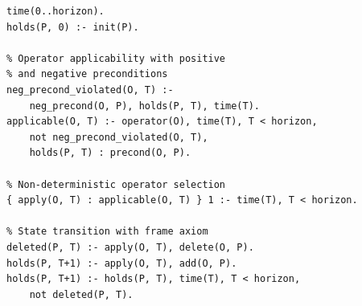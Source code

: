 \begin{lstlisting}[caption={State-space exploration encoding.},label={lst:exploration},style=asp]
time(0..horizon).
holds(P, 0) :- init(P).

% Operator applicability with positive
% and negative preconditions
neg_precond_violated(O, T) :-
    neg_precond(O, P), holds(P, T), time(T).
applicable(O, T) :- operator(O), time(T), T < horizon,
    not neg_precond_violated(O, T),
    holds(P, T) : precond(O, P).

% Non-deterministic operator selection
{ apply(O, T) : applicable(O, T) } 1 :- time(T), T < horizon.

% State transition with frame axiom
deleted(P, T) :- apply(O, T), delete(O, P).
holds(P, T+1) :- apply(O, T), add(O, P).
holds(P, T+1) :- holds(P, T), time(T), T < horizon,
    not deleted(P, T).
\end{lstlisting}
